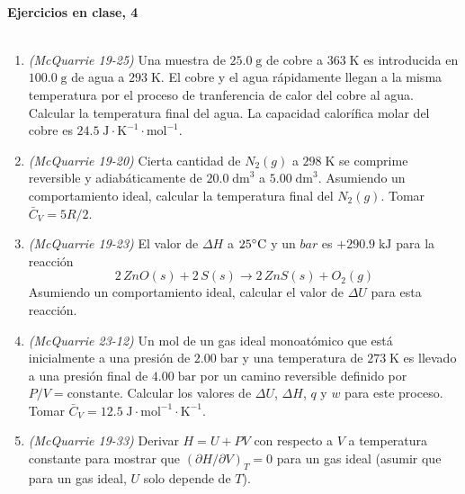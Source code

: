 \documentclass[a4paper,12pt]{article}
\begin{document}

\begin{center}
\HRule \\[0.4cm]
{ \bfseries Ejercicios en clase, 4}\\ %
\HRule \\[0.4cm]
\end{center}


\begin{enumerate}

 \item \textit{(McQuarrie 19-25)} Una muestra de $25.0\;\mbox{g}$ de cobre a $363\;\mbox{K}$ es introducida en $100.0\;\mbox{g}$ de agua a $293\;\mbox{K}$. El cobre y el agua r\'apidamente llegan a la misma temperatura por el proceso de tranferencia de calor del cobre al agua. Calcular la temperatura final del agua. La capacidad calor\'ifica molar del cobre es $24.5\;\mbox{J}\cdot\mbox{K}^{-1}\cdot\mbox{mol}^{-1}$. %

 \item \textit{(McQuarrie 19-20)} Cierta cantidad de $N_2(g)$ a $298\;\mbox{K}$ se comprime reversible y adiab\'aticamente de $20.0\;\mbox{dm}^3$ a $5.00\;\mbox{dm}^3$. Asumiendo un comportamiento ideal, calcular la temperatura final del $N_2(g)$. Tomar $\bar{C}_V=5R/2$. %

 \item \textit{(McQuarrie 19-23)} El valor de $\Delta H$ a $25\celsius$ y un $bar$ es $+290.9\;\mbox{kJ}$ para la reacci\'on
$$2\,ZnO(s)+2\,S(s)\rightarrow 2\,ZnS(s)+O_2(g)$$
Asumiendo un comportamiento ideal, calcular el valor de $\Delta U$ para esta reacci\'on. %

 \item \textit{(McQuarrie 23-12)} Un mol de un gas ideal monoat\'omico que est\'a inicialmente a una presi\'on de $2.00\;\mbox{bar}$ y una temperatura de $273\;\mbox{K}$ es llevado a una presi\'on final de $4.00\;\mbox{bar}$ por un camino reversible definido por $P/V=\mbox{constante}$. Calcular los valores de $\Delta U$, $\Delta H$, $q$ y $w$ para este proceso. Tomar $\bar{C}_V=12.5\;\mbox{J}\cdot\mbox{mol}^{-1}\cdot\mbox{K}^{-1}$. %

 \item \textit{(McQuarrie 19-33)} Derivar $H=U+PV$ con respecto a $V$ a temperatura constante para mostrar que $(\partial H/\partial V)_T=0$ para un gas ideal (asumir que para un gas ideal, $U$ solo depende de $T$). %

\end{enumerate}
\end{document}
